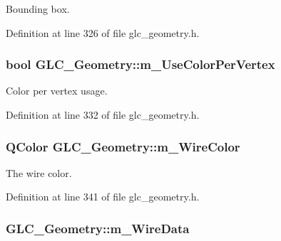 Bounding box. 



Definition at line 326 of file glc\-\_\-geometry.\-h.

\hypertarget{class_g_l_c___geometry_aed849aee431089cfef5d95f32e58f280}{
\subsubsection[{m\-\_\-\-Use\-Color\-Per\-Vertex}]{\setlength{\rightskip}{0pt plus 5cm}bool G\-L\-C\-\_\-\-Geometry\-::m\-\_\-\-Use\-Color\-Per\-Vertex\hspace{0.3cm}{\ttfamily [protected]}}}\label{class_g_l_c___geometry_aed849aee431089cfef5d95f32e58f280}


Color per vertex usage. 



Definition at line 332 of file glc\-\_\-geometry.\-h.

\hypertarget{class_g_l_c___geometry_aeda25b917629cdade9d9657f552a7884}{
\subsubsection[{m\-\_\-\-Wire\-Color}]{\setlength{\rightskip}{0pt plus 5cm}Q\-Color G\-L\-C\-\_\-\-Geometry\-::m\-\_\-\-Wire\-Color\hspace{0.3cm}{\ttfamily [protected]}}}\label{class_g_l_c___geometry_aeda25b917629cdade9d9657f552a7884}


The wire color. 



Definition at line 341 of file glc\-\_\-geometry.\-h.

\hypertarget{class_g_l_c___geometry_a31ededa962f934a0ffae555f3fbcd275}{
\subsubsection[{m\-\_\-\-Wire\-Data}]{ G\-L\-C\-\_\-\-Geometry\-::m\-\_\-\-Wire\-Data\hspace{0.3cm}{\ttfamily [protected]}}}\label{class_g_l_c___geometry_a31ededa962f934a0ffae555f3fbcd275}


